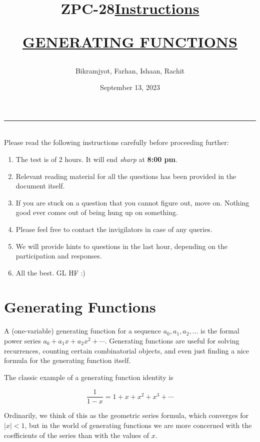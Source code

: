 \documentclass[12pt]{exam}
\title{ZPC-28}
\author{Bikramjyot, Farhan, Ishaan, Rachit}
\date{September 13, 2023}
\begin{document}
\maketitle
\rule{\textwidth}{1pt}
\printanswers

\title{\textbf{\underline{\fontsize{18}{12}\selectfont Instructions}}}\\
Please read the following instructions carefully before proceeding further:\\
\begin{enumerate}
\item The test is of 2 hours. It will end \textit{sharp} at \textbf{8:00 pm}.
\item Relevant reading material for all the questions has been provided in the document itself.
\item If you are stuck on a question that you cannot figure out, move on. Nothing good ever comes out of being hung up on something.
\item Please feel free to contact the invigilators in case of any queries.
\item We will provide hints to questions in the last hour, depending on the participation and responses.
\item All the best. GL HF :)\\
\end{enumerate}
\bigskip
\maketitle
\newpage
\title{\begin{center}\textbf{\underline{\fontsize{16}{12}\selectfont GENERATING FUNCTIONS}}\end{center}}
\section{Generating Functions}

A (one-variable) generating function for a sequence $a_{0}, a_{1}, a_{2}, \ldots$ is the formal power series $a_{0}+a_{1} x+a_{2} x^{2}+\cdots$. Generating functions are useful for solving recurrences, counting certain combinatorial objects, and even just finding a nice formula for the generating function itself.

The classic example of a generating function identity is

$$
\frac{1}{1-x}=1+x+x^{2}+x^{3}+\cdots
$$

Ordinarily, we think of this as the geometric series formula, which converges for $|x|<1$, but in the world of generating functions we are more concerned with the coefficients of the series than with the values of $x$.
\end{document}
